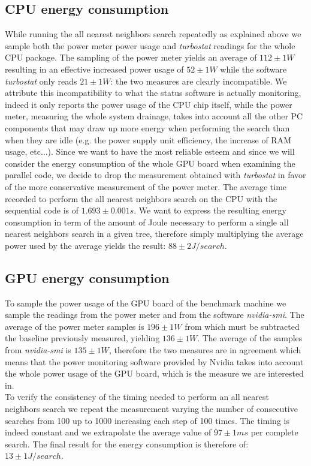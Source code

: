 \subsection{CPU energy consumption}
While running the all nearest neighbors search repeatedly as explained above we sample both the power meter power usage and \textit{turbostat} readings for the whole CPU package. The sampling of the power meter yields an average of $112 \pm 1 \unit{W}$ resulting in an effective increased power usage of $52 \pm 1 \unit{W}$ while the software \textit{turbostat} only reads $21 \pm 1 \unit{W}$: the two measures are clearly incompatible. We attribute this incompatibility to what the status software is actually monitoring, indeed it only reports the power usage of the CPU chip itself, while the power meter, measuring the whole system drainage, takes into account all the other PC components that may draw up more energy when performing the search than when they are idle (e.g. the power supply unit efficiency, the increase of RAM usage, etc...). Since we want to have the most reliable esteem and since we will consider the energy consumption of the whole GPU board when examining the parallel code, we decide to drop the measurement obtained with \textit{turbostat} in favor of the more conservative measurement of the power meter. The average time recorded to perform the all nearest neighbors search on the CPU with the sequential code is of $1.693 \pm 0.001 \unit{s}$. We want to express the resulting energy consumption in term of the amount of Joule necessary to perform a single all nearest neighbors search in a given tree, therefore simply multiplying the average power used by the average yields the result: $88 \pm 2 \unit{J/search}$.

\subsection{GPU energy consumption}
To sample the power usage of the GPU board of the benchmark machine we sample the readings from the power meter and from the software \textit{nvidia-smi}. The average of the power meter samples is $196 \pm 1 \unit{W}$ from which must be subtracted the baseline previously measured, yielding $136 \pm 1 \unit{W}$. The average of the samples from \textit{nvidia-smi} is $135 \pm 1 \unit{W}$, therefore the two measures are in agreement which means that the power monitoring software provided by Nvidia takes into account the whole power usage of the GPU board, which is the measure we are interested in.\\
To verify the consistency of the timing needed to perform an all nearest neighbors search we repeat the measurement varying the number of consecutive searches from 100 up to 1000 increasing each step of 100 times. The timing is indeed constant and we extrapolate the average value of $97 \pm 1 \unit{ms}$ per complete search. The final result for the energy consumption is therefore of: $13 \pm 1 \unit{J/search}$.

